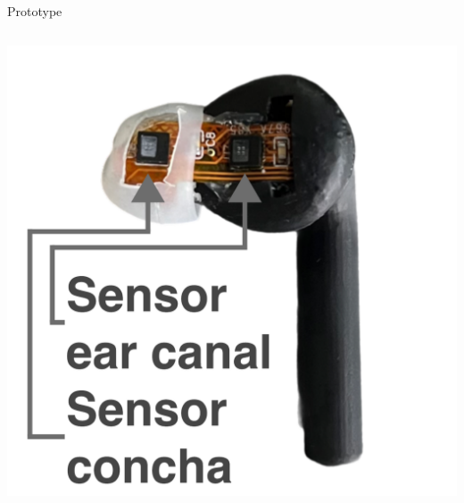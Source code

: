 \documentclass[en]{sdqbeamer}
\begin{document}
\begin{frame}{Prototype}
\begin{columns}[T]
    \begin{column}{.31\textwidth} %
      \includegraphics[width=0.9\linewidth]{../thesis-doc/images/prototype/Earpod_Side2_visual_markers.pdf} %
    \end{column}
  \end{columns}
\end{frame}
\end{document}
